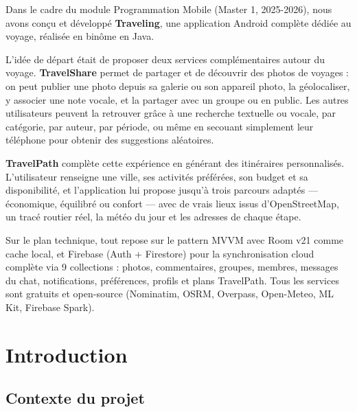 \documentclass[a4paper,12pt,openany]{report}
\begin{document}
\begin{tcolorbox}[mybox, colback=lightbg, colframe=bord,
  left=14pt, right=14pt, top=12pt, bottom=12pt,
  title=\large\bfseries\color{navy}Résumé]

Dans le cadre du module Programmation Mobile (Master 1, 2025-2026), nous avons
conçu et développé \textbf{Traveling}, une application Android complète dédiée
au voyage, réalisée en binôme en Java.

L'idée de départ était de proposer deux services complémentaires autour du voyage.
\textbf{TravelShare} permet de partager et de découvrir des photos de voyages :
on peut publier une photo depuis sa galerie ou son appareil photo, la géolocaliser,
y associer une note vocale, et la partager avec un groupe ou en public. Les autres
utilisateurs peuvent la retrouver grâce à une recherche textuelle ou vocale, par
catégorie, par auteur, par période, ou même en secouant simplement leur téléphone
pour obtenir des suggestions aléatoires.

\textbf{TravelPath} complète cette expérience en générant des itinéraires personnalisés.
L'utilisateur renseigne une ville, ses activités préférées, son budget et sa disponibilité,
et l'application lui propose jusqu'à trois parcours adaptés — économique, équilibré ou confort —
avec de vrais lieux issus d'OpenStreetMap, un tracé routier réel, la météo du jour
et les adresses de chaque étape.

Sur le plan technique, tout repose sur le pattern MVVM avec Room v21 comme cache local,
et Firebase (Auth + Firestore) pour la synchronisation cloud complète via
9 collections : photos, commentaires, groupes, membres, messages du chat, notifications,
préférences, profils et plans TravelPath. Tous les services sont gratuits et open-source
(Nominatim, OSRM, Overpass, Open-Meteo, ML Kit, Firebase Spark).
\end{tcolorbox}

\clearpage

\chapter{Introduction}

\section{Contexte du projet}
\end{document}
